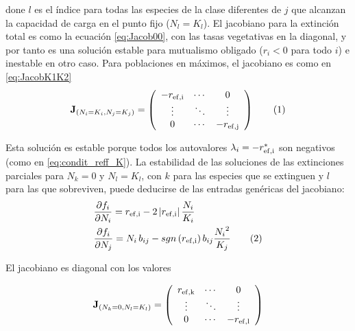 \noindent done $l$ es el índice para todas las especies de la clase diferentes de $j$ que alcanzan la capacidad de carga en el punto fijo ($N_{l}=K_{l}$). El jacobiano para la extinción total es como la ecuación \ref{eq:Jacob00}, con las tasas vegetativas en la diagonal, y por tanto es una solución estable para mutualismo obligado ($r_i<0$ para todo $i$) e inestable en otro caso. Para poblaciones en máximos, el jacobiano es como en \ref{eq:JacobK1K2}
\begin{equation}
\displaystyle
\mathbf{J}_{\left(N_i=K_i, N_j=K_j\right)}= \left(
  \begin{array}{ccc}
    -r_{\rm{ef},i} & \cdots & 0\\
    \vdots & \ddots & \vdots \\
    0 & \cdots & -r_{\rm{ef},j}
    \end{array} \right)
\stepcounter{equation}\tag{\theequation}\label{eq:GenJacobK1K2}
\end{equation}

Esta solución es estable porque todos los autovalores $\lambda_i=-r_{\rm{ef},i}^{\ast}$ son negativos (como en \ref{eq:condit_reff_K}). La estabilidad de las soluciones de las extinciones parciales para $N_k=0$ y $N_l=K_l$, con $k$ para las especies que se extinguen y $l$ para las que sobreviven, puede deducirse de las entradas genéricas del jacobiano:
\begin{align*}
\displaystyle &\frac{\partial f_i}{\partial N_i} = r_{\rm{ef},i}-2\left|r_{\rm{ef},i}\right| \frac{N_i}{K_i}\\
\displaystyle &\frac{\partial f_i}{\partial N_j} = N_i\,b_{ij}-sgn\left(r_{\rm{ef},i}\right)b_{ij}\frac{{N_i}^2}{K_j}
\stepcounter{equation}\tag{\theequation}\label{eq:partial_ij}
\end{align*}

El jacobiano es diagonal con los valores

\begin{equation}
\displaystyle
\mathbf{J}_{\left(N_k=0,N_l=K_l\right)}= \left(
  \begin{array}{ccc}
    r_{\rm{ef},k} & \cdots & 0\\
    \vdots & \ddots & \vdots \\
    0 & \cdots & -r_{\rm{ef},l}
    \end{array} \right)
\label{eq:Jacob0_iK_j}
\end{equation}


